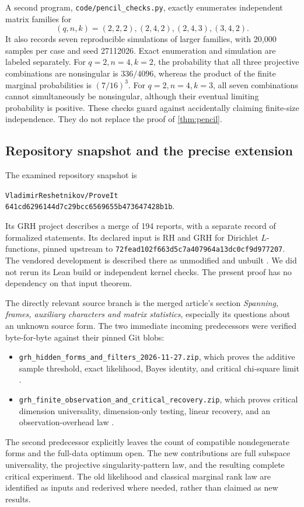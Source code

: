 A second program, \texttt{code/pencil\_checks.py}, exactly enumerates
independent matrix families for
\[
 (q,n,k)=(2,2,2),(2,4,2),(2,4,3),(3,4,2).
\]
It also records seven reproducible simulations of larger families, with
20,000 samples per case and seed 27112026. Exact enumeration and simulation
are labeled separately. For $q=2,n=4,k=2$, the probability that all three
projective combinations are nonsingular is $336/4096$, whereas the product
of the finite marginal probabilities is $(7/16)^3$. For
$q=2,n=4,k=3$, all seven combinations cannot simultaneously be nonsingular,
although their eventual limiting probability is positive. These checks
guard against accidentally claiming finite-size independence. They do not
replace the proof of \cref{thm:pencil}.

\subsection{Repository snapshot and the precise extension}

The examined repository snapshot is
\begin{center}
\texttt{VladimirReshetnikov/ProveIt}\\
\small\texttt{641cd6296144d7c29bcc6569655b473647428b1b}.
\end{center}
Its GRH project describes a merge of 194 reports, with a separate record
of formalized statements. Its declared input is RH and GRH for Dirichlet
$L$-functions, pinned upstream to
\texttt{72fead102f663d5c7a407964a13dc0cf9d977207}. The vendored development
is described there as unmodified and unbuilt \cite{repo}. We did not rerun
its Lean build or independent kernel checks. The present proof has no
dependency on that input theorem.

The directly relevant source branch is the merged article's section
\emph{Spanning, frames, auxiliary characters and matrix statistics},
especially its questions about an unknown source form. The two immediate
incoming predecessors were verified byte-for-byte against their pinned
Git blobs:
\begin{itemize}
\item \texttt{grh\_hidden\_forms\_and\_filters\_2026-11-27.zip},
which proves the additive sample threshold, exact likelihood, Bayes
identity, and critical chi-square limit \cite{hidden}.
\item \texttt{grh\_finite\_observation\_and\_critical\_recovery.zip},
which proves critical dimension universality, dimension-only testing,
linear recovery, and an observation-overhead law \cite{critical}.
\end{itemize}
The second predecessor explicitly leaves the count of compatible
nondegenerate forms and the full-data optimum open. The new contributions
are full subspace universality, the projective singularity-pattern law,
and the resulting complete critical experiment. The old likelihood and
classical marginal rank law are identified as inputs and rederived where
needed, rather than claimed as new results.

